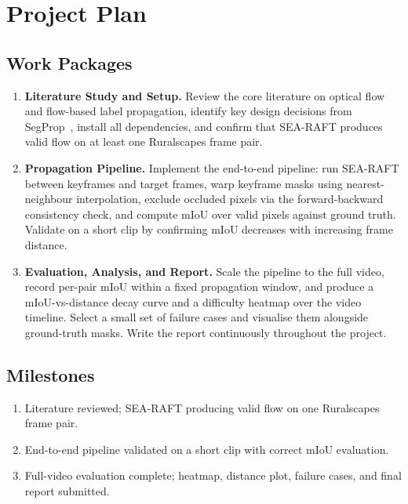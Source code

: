 \documentclass[rnd]{mas_proposal}
\begin{document}
\section{Project Plan}

\subsection{Work Packages}

\begin{enumerate}

    \item[WP1] \textbf{Literature Study and Setup.} Review the core literature
    on optical flow and flow-based label propagation, identify key design
    decisions from SegProp~\cite{segprop2020}, install all dependencies, and
    confirm that SEA-RAFT produces valid flow on at least one Ruralscapes frame
    pair.

    \item[WP2] \textbf{Propagation Pipeline.} Implement the end-to-end
    pipeline: run SEA-RAFT between keyframes and target frames, warp keyframe
    masks using nearest-neighbour interpolation, exclude occluded pixels via
    the forward-backward consistency check, and compute mIoU over valid pixels
    against ground truth. Validate on a short clip by confirming mIoU decreases
    with increasing frame distance.

    \item[WP3] \textbf{Evaluation, Analysis, and Report.} Scale the pipeline
    to the full video, record per-pair mIoU within a fixed propagation window,
    and produce a mIoU-vs-distance decay curve and a difficulty heatmap over
    the video timeline. Select a small set of failure cases and visualise them
    alongside ground-truth masks. Write the report continuously throughout the
    project.

\end{enumerate}

\subsection{Milestones}

\begin{enumerate}
    \item[M1] Literature reviewed; SEA-RAFT producing valid flow on one
    Ruralscapes frame pair.
    \item[M2] End-to-end pipeline validated on a short clip with correct mIoU
    evaluation.
    \item[M3] Full-video evaluation complete; heatmap, distance plot, failure
    cases, and final report submitted.
\end{enumerate}
\end{document}
